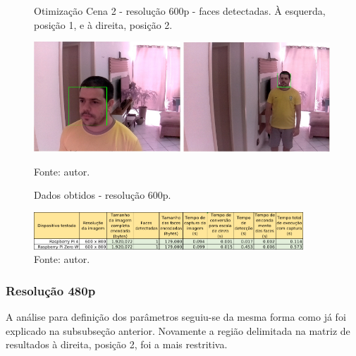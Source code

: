 \begin{figure}[H]
    \centering
    \caption[Otimização Cena 2 - resolução 600p - faces detectadas. À esquerda posição 1 e à direita, posição 2]{Otimização Cena 2 - resolução 600p - faces detectadas. À esquerda, posição 1, e à direita, posição 2.}
    \includegraphics[width=0.49\textwidth]{Cap4_Experimentos_Realizados/Figures/cena2_800x600_pos1_face.jpg}
    \includegraphics[width=0.49\textwidth]{Cap4_Experimentos_Realizados/Figures/cena2_800x600_pos2_face.jpg}
    \caption*{Fonte: autor.}
    \label{fig:otimizacaoCena2_600p_faces}
\end{figure}

\begin{figure}[H]
    \centering
    \caption[Dados obtidos - resolução 600p.]{Dados obtidos - resolução 600p.}
    \includegraphics[width=0.90\textwidth]{Cap4_Experimentos_Realizados/Figures/cena2_dados_600p_br.jpg}
    \caption*{Fonte: autor.}
    \label{fig:dadosCena2_600p}
\end{figure}

\subsubsection{Resolução 480p} \label{sssec:resolution2-2}

A análise para definição dos parâmetros seguiu-se da mesma forma como já foi explicado na subsubseção anterior. Novamente a região delimitada na matriz de resultados à direita, posição 2, foi a mais restritiva.

